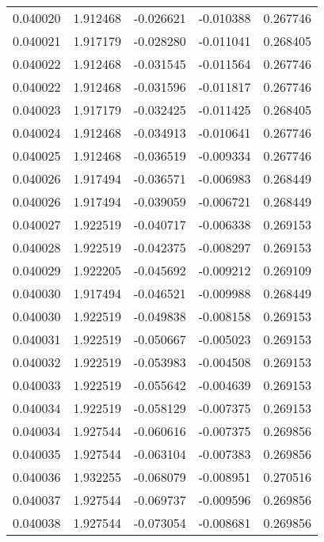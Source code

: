 \begin{tabular}{lrrrr}
0.040020    &  1.912468 & -0.026621 & -0.010388 &             0.267746 \\
0.040021    &  1.917179 & -0.028280 & -0.011041 &             0.268405 \\
0.040022    &  1.912468 & -0.031545 & -0.011564 &             0.267746 \\
0.040022    &  1.912468 & -0.031596 & -0.011817 &             0.267746 \\
0.040023    &  1.917179 & -0.032425 & -0.011425 &             0.268405 \\
0.040024    &  1.912468 & -0.034913 & -0.010641 &             0.267746 \\
0.040025    &  1.912468 & -0.036519 & -0.009334 &             0.267746 \\
0.040026    &  1.917494 & -0.036571 & -0.006983 &             0.268449 \\
0.040026    &  1.917494 & -0.039059 & -0.006721 &             0.268449 \\
0.040027    &  1.922519 & -0.040717 & -0.006338 &             0.269153 \\
0.040028    &  1.922519 & -0.042375 & -0.008297 &             0.269153 \\
0.040029    &  1.922205 & -0.045692 & -0.009212 &             0.269109 \\
0.040030    &  1.917494 & -0.046521 & -0.009988 &             0.268449 \\
0.040030    &  1.922519 & -0.049838 & -0.008158 &             0.269153 \\
0.040031    &  1.922519 & -0.050667 & -0.005023 &             0.269153 \\
0.040032    &  1.922519 & -0.053983 & -0.004508 &             0.269153 \\
0.040033    &  1.922519 & -0.055642 & -0.004639 &             0.269153 \\
0.040034    &  1.922519 & -0.058129 & -0.007375 &             0.269153 \\
0.040034    &  1.927544 & -0.060616 & -0.007375 &             0.269856 \\
0.040035    &  1.927544 & -0.063104 & -0.007383 &             0.269856 \\
0.040036    &  1.932255 & -0.068079 & -0.008951 &             0.270516 \\
0.040037    &  1.927544 & -0.069737 & -0.009596 &             0.269856 \\
0.040038    &  1.927544 & -0.073054 & -0.008681 &             0.269856 \\

\end{tabular}
